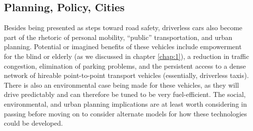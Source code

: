 \subsection{Planning, Policy, Cities}

Besides being presented as steps toward road safety, driverless cars
also become part of the rhetoric of personal mobility, ``public''
transportation, and urban planning. Potential or imagined
benefits of these vehicles include empowerment for the blind or
elderly (as we discussed in chapter \ref{chap:1}), a reduction in
traffic congestion, elimination of parking problems, and the
persistent access to a dense network of hireable point-to-point
transport vehicles (essentially, driverless taxis). There is
  also an environmental case being made for these vehicles, as they
  will drive predictably and can therefore be tuned to be very
  fuel-efficient. The social, environmental, and urban planning
implications are at least worth considering in passing before moving
on to consider alternate models for how these technologies could be
developed. 

